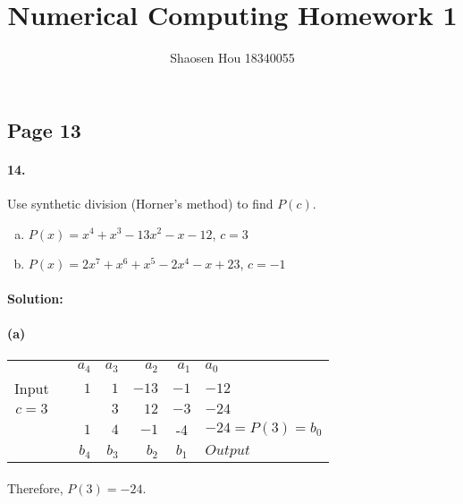 \documentclass{article}  %
\title{Numerical Computing Homework 1}
\author{Shaosen Hou 18340055}
\begin{document}
 
    \maketitle

        \subsection*{Page 13} 
        \paragraph{14.}Use synthetic division (Horner’s method) to find \(P(c)\).
        \begin{enumerate}[(a)]
            \item \(P(x) = x^4 + x^3 - 13x^2 - x - 12\), \(c = 3\)
            \item \(P(x) = 2x^7 + x^6 + x^5 - 2x^4 - x + 23\), \(c = -1\)
        \end{enumerate}
            \paragraph{Solution:}
            \paragraph{(a)}
            \renewcommand\tabcolsep{12.0pt} %
            \begin{threeparttable} %
                \begin{tabular}{rrrrrrl} 
                 & & \(a_4\) & \(a_3\) & \(a_2\) & \(a_1\) & \(a_0\) \\ 
                \cline{1-1}
                \multicolumn{1}{c|}{Input} & & \(1\) & \(1\) & \(-13\) & \(-1\) & \(-12\)\\ 
                \multicolumn{1}{c|}{\(c=3\)} & & & \(3\) & \(12\) & \(-3\) & \(-24\)\\
                \hline
                 & & \(1\) & \(4\) & \(-1\) & \multicolumn{1}{c|}{-4} & \(-24 = P(3) = b_0\)\\
                 & & \(b_4\) & \(b_3\) & \(b_2\) & \multicolumn{1}{c|}{\(b_1\)} & \(Output\)\\
                \cline{7-7}
                \end{tabular} 
            \end{threeparttable}
            \paragraph{}Therefore, \(P(3) = -24.\)
\end{document}
